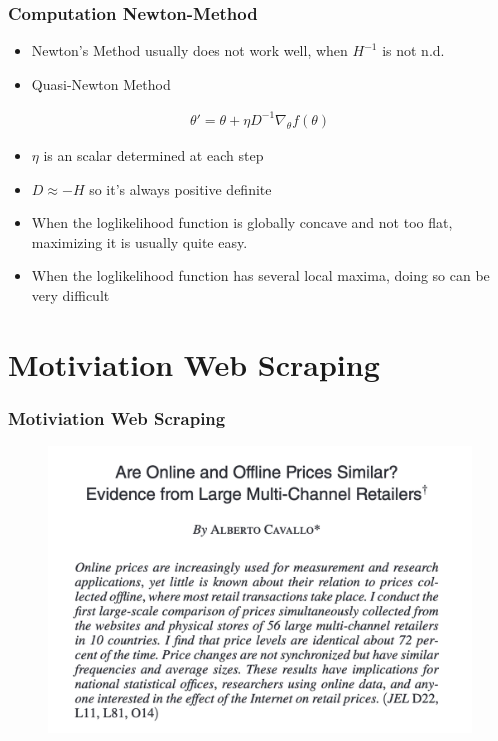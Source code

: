 \documentclass[
  shownotes,
  xcolor={svgnames},
  hyperref={colorlinks,citecolor=DarkBlue,linkcolor=DarkRed,urlcolor=DarkBlue}
  , aspectratio=169]{beamer}
\begin{document}
\begin{frame}[fragile]
\frametitle{Computation Newton-Method}
\begin{itemize}
\item Newton’s Method usually does not work well, when $H^{-1}$ is not n.d.
\medskip
\item Quasi-Newton Method
\end{itemize}

\begin{align}
    \theta'=\theta + \eta D^{-1} \nabla_\theta f(\theta)
    \end{align}

\begin{itemize}
  \item $\eta$ is an scalar determined at each step
  \medskip
  \item $D \approx -H$ so it's always positive definite
  \medskip
  \item When the loglikelihood function is globally concave and not too flat, maximizing it is usually quite easy. 
  \medskip
  \item When the loglikelihood function has several local maxima, doing so can be very difficult 
\end{itemize}

\end{frame}
\section{Motiviation Web Scraping}
\begin{frame}
\frametitle{Motiviation Web Scraping}



\begin{figure}[H] \centering
  \centering
  \includegraphics[scale=0.45]{figures/Cavallo_title}
  \\
  \tiny
\end{figure}
 

\end{frame}
\end{document}
